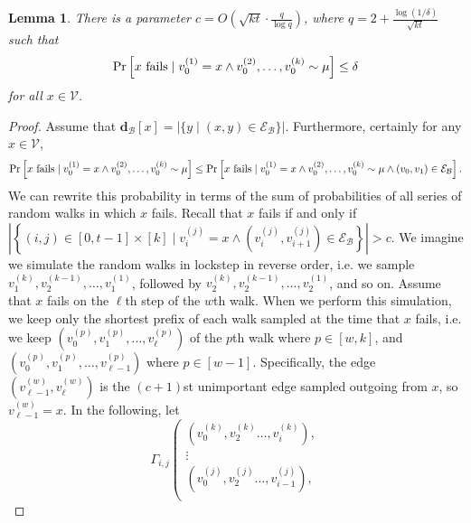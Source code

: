 \documentclass[10]{article}
\newtheorem{lemma}[theorem]{Lemma}
\begin{document}
\begin{lemma} \label{lem:rw:setc}
There is a parameter $c = O\left (\sqrt{kt} \cdot \frac{q}{\log q} \right )$, where $q = 2 + \frac{\log(1/\delta)}{\sqrt{kt}}$ such that 
%
\begin{equation*}
\Pr \left [\textnormal{$x$ fails} \mid v_0^{(1)} = x \wedge v_0^{(2)}, \dots, v_0^{(k)} \sim \mu \right ] \leq \delta
\end{equation*}
%
for all $x \in \mathcal{V}$.
\end{lemma}
%
\begin{proof}
Assume that $\mathbf{d}_\mathcal{B}[x] = |\{y \mid (x, y) \in \mathcal{E}_\mathcal{B}\}|$.
Furthermore, certainly for any $x \in \mathcal{V}$,
%
\begin{equation*}
\Pr \left [\textnormal{$x$ fails} \mid v_0^{(1)} = x \wedge v_0^{(2)}, \dots, v_0^{(k)} \sim \mu \right ]
\leq 
\Pr \left [\textnormal{$x$ fails} \mid v_0^{(1)} = x \wedge v_0^{(2)}, \dots, v_0^{(k)} \sim \mu \wedge (v_0, v_1) \in \mathcal{E}_\mathcal{B} \right ].
\end{equation*}
%
We can rewrite this probability in terms of the sum of probabilities of all series of random walks in which $x$ fails.  
Recall that $x$ fails if and only if 
$\left | \left \{ (i,j) \in [0, t - 1] \times [k] \mid v_i^{(j)} = x 
	\wedge \left ( v_i^{(j)}, v_{i+1}^{(j)} \right ) \in \mathcal{E}_\mathcal{B} \right \} \right | > c$.
We imagine we simulate the random walks in lockstep in reverse order, i.e. we sample $v_1^{(k)}, v_2^{(k-1)}, \dots, v_1^{(1)}$, followed by $v_2^{(k)}, v_2^{(k-1)}, \dots, v_2^{(1)}$, and so on.
Assume that $x$ fails on the $\ell$th step of the $w$th walk.
When we perform this simulation, we keep only the shortest prefix of each walk sampled at the time that $x$ fails, i.e. we keep $\left (v_0^{(p)}, v_1^{(p)},  \dots, v_\ell^{(p)} \right )$ of the $p$th walk where $p \in [w, k]$, and $\left (v_0^{(p)}, v_1^{(p)},  \dots, v_{\ell-1}^{(p)} \right )$ where $p \in [w-1]$. 
Specifically, the edge $\left ( v_{\ell-1}^{(w)}, v_{\ell}^{(w)} \right )$ is the $(c+1)$st unimportant edge sampled outgoing from $x$, so $v_{\ell-1}^{(w)} = x$.
In the following, let 
%
\begin{equation} \label{eq:rw:gamma}
\Gamma_{i, j} \left ( {\substack{
	\left (v_0^{(k)}, v_2^{(k)} \dots, v_i^{(k)} \right ), \\
	\vdots \\
	\left (v_0^{(j)}, v_2^{(j)} \dots, v_{i-1}^{(j)} \right ), \\
}}
\end{equation}
\end{proof}
\end{document}
